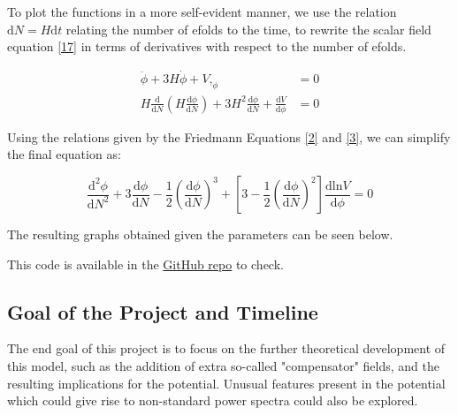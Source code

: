 \documentclass[aps,prd,reprint,preprintnumbers,showpacs,floatfix,nofootinbib,superscript address]{revtex4-2}
\begin{document}
To plot the functions in a more self-evident manner, we use the relation $\mathrm{d}N = H \mathrm{d}t$ relating the number of efolds to the time, to rewrite the scalar field equation \ref{17} in terms of derivatives with respect to the number of efolds.

\begin{align}
    \ddot{\phi} + 3H\dot{\phi} + V,_\phi &= 0 
    \\
    H \frac{\mathrm{d}}{\mathrm{d}N} \left(H \frac{\mathrm{d}\phi}{\mathrm{d}N} \right) + 3 H^2 \frac{\mathrm{d}\phi}{\mathrm{d}N} + \frac{\mathrm{d}V}{\mathrm{d}\phi} &= 0    
\end{align}

Using the relations given by the Friedmann Equations \ref{2} and \ref{3}, we can simplify the final equation as:

\begin{equation}
    \frac{\mathrm{d}^2\phi}{\mathrm{d}N^2} + 3 \frac{\mathrm{d}\phi}{\mathrm{d}N} - \frac{1}{2} \left( \frac{\mathrm{d}\phi}{\mathrm{d}N} \right)^3 + \left[ 3 - \frac{1}{2} \left( \frac{\mathrm{d}\phi}{\mathrm{d}N} \right)^2 \right] \frac{\mathrm{d}\text{ln}V}{\mathrm{d}\phi}  = 0
\end{equation}

The resulting graphs obtained given the parameters can be seen below. 

This code is available in the \href{https://github.com/PrabhodaCS/Part-III-Inflation-Project}{GitHub repo} to check.

\newpage

\subsection{Goal of the Project and Timeline}

The end goal of this project is to focus on the further theoretical development of this model, such as the addition of extra so-called "compensator" fields, and the resulting implications for the potential. Unusual features present in the potential which could give rise to non-standard power spectra could also be explored. 
\end{document}

